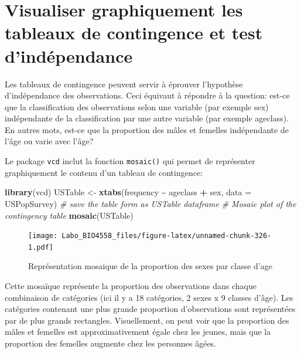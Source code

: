 \documentclass[
  12pt,
]{book}
\newenvironment{Shaded}{\begin{snugshade}}{\end{snugshade}}
\newcommand{\CommentTok}[1]{\textcolor[rgb]{0.56,0.35,0.01}{\textit{#1}}}
\newcommand{\DataTypeTok}[1]{\textcolor[rgb]{0.13,0.29,0.53}{#1}}
\newcommand{\KeywordTok}[1]{\textcolor[rgb]{0.13,0.29,0.53}{\textbf{#1}}}
\newcommand{\NormalTok}[1]{#1}
\newcommand{\OperatorTok}[1]{\textcolor[rgb]{0.81,0.36,0.00}{\textbf{#1}}}
\newcommand{\StringTok}[1]{\textcolor[rgb]{0.31,0.60,0.02}{#1}}
\begin{document}
\hypertarget{visualiser-graphiquement-les-tableaux-de-contingence-et-test-dinduxe9pendance}{%
\section{Visualiser graphiquement les tableaux de contingence et test d'indépendance}\label{visualiser-graphiquement-les-tableaux-de-contingence-et-test-dinduxe9pendance}}

Les tableaux de contingence peuvent servir à éprouver l'hypothèse d'indépendance des observations. Ceci équivaut à répondre à la question: est-ce que la classification des observations selon une variable (par exemple sex) indépendante de la classification par une autre variable (par exemple ageclass). En autres mots, est-ce que la proportion des mâles et femelles indépendante de l'âge ou varie avec l'âge?

Le package \texttt{vcd} inclut la fonction \texttt{mosaic()} qui permet de représenter graphiquement le contenu d'un tableau de contingence:

\begin{Shaded}
\begin{Highlighting}[]
\KeywordTok{library}\NormalTok{(vcd)}
\NormalTok{USTable \textless{}{-}}\StringTok{ }\KeywordTok{xtabs}\NormalTok{(frequency }\OperatorTok{\textasciitilde{}}\StringTok{ }\NormalTok{ageclass }\OperatorTok{+}\StringTok{ }\NormalTok{sex, }\DataTypeTok{data =}\NormalTok{ USPopSurvey) }\CommentTok{\# save the table form as USTable dataframe}
\CommentTok{\# Mosaic plot of the contingency table}
\KeywordTok{mosaic}\NormalTok{(USTable)}
\end{Highlighting}
\end{Shaded}

\begin{figure}
\centering
\texttt{[image: Labo\_BIO4558\_files/figure-latex/unnamed-chunk-326-1.pdf]}
\caption{\label{fig:unnamed-chunk-326}Représentation mosaique de la proportion des sexes par classe d'age}
\end{figure}

Cette mosaïque représente la proportion des observations dans chaque combinaison de catégories (ici il y a 18 catégories, 2 sexes x 9 classes d'âge). Les catégories contenant une plus grande proportion d'observations sont représentées par de plus grands rectangles. Visuellement, on peut voir que la proportion des mâles et femelles est approximativement égale chez les jeunes, mais que la proportion des femelles augmente chez les personnes âgées.
\end{document}
